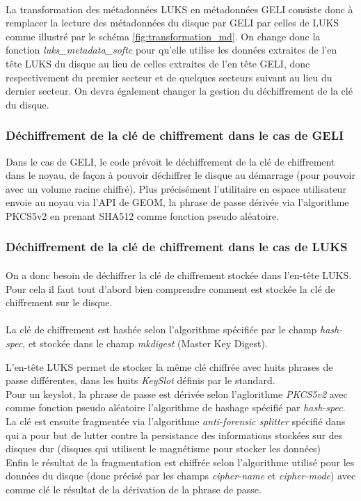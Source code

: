 \paragraph{}
La transformation des métadonnées LUKS en métadonnées GELI consiste donc à 
remplacer la lecture des métadonnées du disque par GELI par celles de LUKS 
comme illustré par le schéma \ref{fig:transformation_md}. On change donc la 
fonction {\em luks\_metadata\_softc} pour qu'elle utilise les données extraites
de l'en tête LUKS du disque au lieu de celles extraites de l'en tête GELI, donc
respectivement du premier secteur et de quelques secteurs suivant au lieu du 
dernier secteur. On devra également changer la gestion du déchiffrement de la 
clé du disque.


\subsubsection{Déchiffrement de la clé de chiffrement dans le cas de GELI}
Dans le cas de GELI, le code prévoit le déchiffrement de la clé de chiffrement 
dans le noyau, de façon à pouvoir déchiffrer le disque au démarrage (pour 
pouvoir avec un volume racine chiffré). Plus précisément l'utilitaire en espace
utilisateur envoie au noyau via l'API de GEOM, la phrase de passe dérivée via
l'algorithme PKCS5v2 en prenant SHA512 comme fonction pseudo aléatoire.


\subsubsection{Déchiffrement de la clé de chiffrement dans le cas de LUKS}
\paragraph{}
On a donc besoin de déchiffrer la clé de chiffrement stockée dans l'en-tête LUKS.
Pour cela il faut tout d'abord bien comprendre comment est stockée la clé de 
chiffrement sur le disque.

\paragraph{}
La clé de chiffrement est hashée selon l'algorithme spécifiée par le champ
{\em hash-spec}, et stockée dans le champ {\em mkdigest} (Master Key Digest).

L'en-tête LUKS permet de stocker la même clé chiffrée avec huits phrases de passe
différentes, dans les huits {\em KeySlot} définis par le standard.
\\
Pour un keyslot, la phrase de passe est dérivée selon l'aglorithme {\em PKCS5v2}
avec comme fonction pseudo aléatoire l'algorithme de hashage spécifié par 
{\em hash-spec}. La clé est ensuite fragmentée via l'algorithme 
{\em anti-forensic splitter} spécifié dans \cite{AFsplitting} qui a pour but de
lutter contre la persistance des informations stockées sur des disques dur
(disques qui utilisent le magnétisme pour stocker les données)
\\
Enfin le résultat de la fragmentation est chiffrée selon l'algorithme utilisé 
pour les données du disque (donc précisé par les champs {\em cipher-name} et 
{\em cipher-mode}) avec comme clé le résultat de la dérivation de la phrase de
passe.

